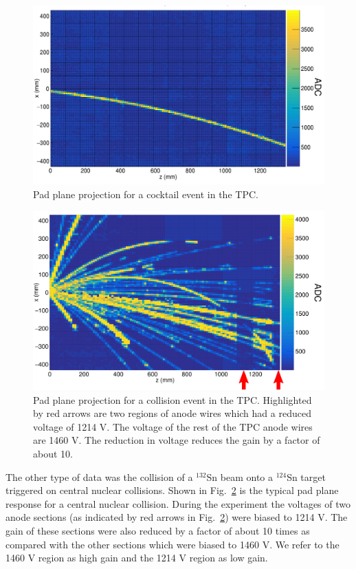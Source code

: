 \documentclass[review]{elsarticle}
\begin{document}
\begin{figure}[ht!]
\includegraphics[width=\linewidth]{cocktail.png}
\caption{Pad plane projection for a cocktail event in the TPC.}
\label{fig:cocktail}
\end{figure}

\begin{figure}[ht!]
\includegraphics[width=\linewidth]{data.png}
\caption{Pad plane projection for a collision event in the TPC. Highlighted by red arrows are two regions of anode wires which had a reduced voltage of 1214 V. The voltage of the rest of the TPC anode wires are 1460 V. The reduction in voltage reduces the gain by a factor of about 10. }
\label{fig:data}
\end{figure}



The other type of data was the collision of a ${}^{132}$Sn beam onto a ${}^{124}$Sn target triggered on central nuclear collisions. Shown in Fig.~\ref{fig:data} is the typical pad plane response for a central nuclear collision. During the experiment the voltages of two anode sections (as indicated by red arrows in Fig.~\ref{fig:data}) were biased to 1214 V. The gain of these sections were also reduced by a factor of about 10 times as compared with the other sections which were biased to 1460 V. We refer to the 1460 V region as high gain and the 1214 V region as low gain. 
\end{document}
